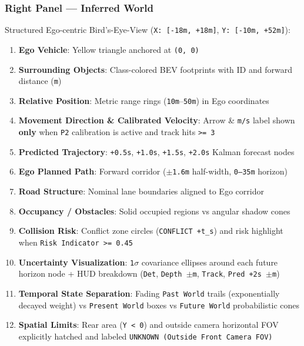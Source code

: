 \documentclass[10.5pt,a4paper]{article}
\begin{document}
\subsubsection{Right Panel --- Inferred World}
Structured Ego-centric Bird's-Eye-View (\texttt{X:\allowbreak{} [-\allowbreak{}18m,\allowbreak{} +18m]}, \texttt{Y:\allowbreak{} [-\allowbreak{}10m,\allowbreak{} +52m]}):

\begin{enumerate}[leftmargin=1.8em,itemsep=2pt]
\item \textbf{Ego Vehicle}: Yellow triangle anchored at \texttt{(0,\allowbreak{} 0)}
\item \textbf{Surrounding Objects}: Class-colored BEV footprints with ID and forward distance (\texttt{m})
\item \textbf{Relative Position}: Metric range rings (\texttt{10m}--\texttt{50m}) in Ego coordinates
\item \textbf{Movement Direction \& Calibrated Velocity}: Arrow \& \texttt{m/\allowbreak{}s} label shown \textbf{only} when \texttt{P2} calibration is active and track hits \texttt{>= 3}
\item \textbf{Predicted Trajectory}: \texttt{+0.\allowbreak{}5s}, \texttt{+1.\allowbreak{}0s}, \texttt{+1.\allowbreak{}5s}, \texttt{+2.\allowbreak{}0s} Kalman forecast nodes
\item \textbf{Ego Planned Path}: Forward corridor (\texttt{$\pm$1.\allowbreak{}6m} half-width, \texttt{0--35m} horizon)
\item \textbf{Road Structure}: Nominal lane boundaries aligned to Ego corridor
\item \textbf{Occupancy / Obstacles}: Solid occupied regions vs angular shadow cones
\item \textbf{Collision Risk}: Conflict zone circles (\texttt{CONFLICT +t\_\allowbreak{}s}) and risk highlight when \texttt{Risk Indicator >= 0.\allowbreak{}45}
\item \textbf{Uncertainty Visualization}: \texttt{1$\sigma$} covariance ellipses around each future horizon node + HUD breakdown (\texttt{Det}, \texttt{Depth $\pm$m}, \texttt{Track}, \texttt{Pred +2s $\pm$m})
\item \textbf{Temporal State Separation}: Fading \texttt{Past World} trails (exponentially decayed weight) vs \texttt{Present World} boxes vs \texttt{Future World} probabilistic cones
\item \textbf{Spatial Limits}: Rear area (\texttt{Y < 0}) and outside camera horizontal FOV explicitly hatched and labeled \texttt{UNKNOWN (Outside Front Camera FOV)}
\end{enumerate}
\end{document}
